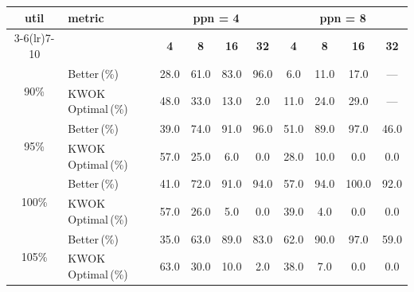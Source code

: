 \begin{tabular}{@{}c l *{8}{c}@{}}
\toprule
\multirow{2}{*}{\textbf{util}} & \multirow{2}{*}{\textbf{metric}} &\multicolumn{4}{c}{\textbf{ppn = 4}} & \multicolumn{4}{c}{\textbf{ppn = 8}}\\
\cmidrule(lr){3-6}\cmidrule(lr){7-10}
 &  & \textbf{4} & \textbf{8} & \textbf{16} & \textbf{32} & \textbf{4} & \textbf{8} & \textbf{16} & \textbf{32}\\
\midrule
\multirow{2}{*}{90\%}
& Better\,(\%) & 28.0 & 61.0 & 83.0 & 96.0 & 6.0 & 11.0 & 17.0 & \multicolumn{1}{c}{—} \\
& KWOK\,Optimal\,(\%) & 48.0 & 33.0 & 13.0 & 2.0 & 11.0 & 24.0 & 29.0 & \multicolumn{1}{c}{—} \\
\midrule
\multirow{2}{*}{95\%}
& Better\,(\%) & 39.0 & 74.0 & 91.0 & 96.0 & 51.0 & 89.0 & 97.0 & 46.0 \\
& KWOK\,Optimal\,(\%) & 57.0 & 25.0 & 6.0 & 0.0 & 28.0 & 10.0 & 0.0 & 0.0 \\
\midrule
\multirow{2}{*}{100\%}
& Better\,(\%) & 41.0 & 72.0 & 91.0 & 94.0 & 57.0 & 94.0 & 100.0 & 92.0 \\
& KWOK\,Optimal\,(\%) & 57.0 & 26.0 & 5.0 & 0.0 & 39.0 & 4.0 & 0.0 & 0.0 \\
\midrule
\multirow{2}{*}{105\%}
& Better\,(\%) & 35.0 & 63.0 & 89.0 & 83.0 & 62.0 & 90.0 & 97.0 & 59.0 \\
& KWOK\,Optimal\,(\%) & 63.0 & 30.0 & 10.0 & 2.0 & 38.0 & 7.0 & 0.0 & 0.0 \\
\bottomrule
\end{tabular}
